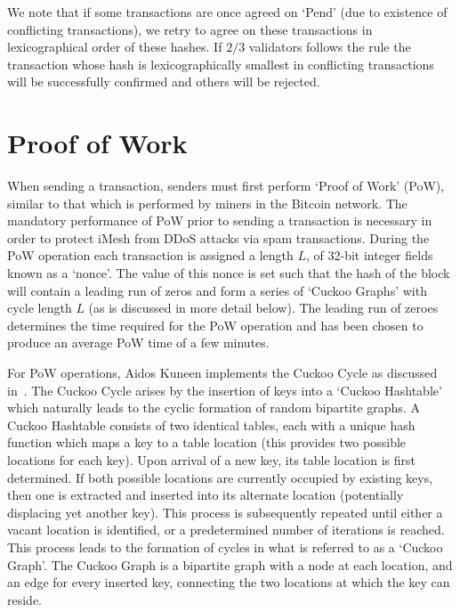 \documentclass[a4paper,10pt,twocolumn]{article}
\begin{document}
We note that if some transactions are once agreed on `Pend' (due to existence of conflicting transactions), we retry to agree on these transactions in lexicographical order of these hashes.
If \(2/3\) validators follows the rule the transaction whose hash is lexicographically smallest in conflicting transactions will be successfully confirmed and others will be rejected.

	\vspace{1.5mm}
	
	
	\section{Proof of Work}
	\label{sec:PoW}
	
	When sending a transaction, senders must first perform `Proof of Work' (PoW), similar to that which is performed by miners in the 
	Bitcoin network. The mandatory performance of PoW prior to sending a transaction is necessary in order to protect iMesh from DDoS 
	attacks via spam transactions. During the PoW operation each transaction is assigned a length \(L\), of 32-bit integer fields known as a `nonce'. 
	The value of this nonce is set such that the hash of the block will contain a leading run of zeros and form a series of `Cuckoo Graphs' with cycle length \(L\) (as is discussed in more detail below). The leading run of zeroes determines the time required for the PoW operation and has been chosen to produce an 
	average PoW time of a few minutes.
	
	\vspace{2.5mm}
	
	For PoW operations, Aidos Kuneen implements the Cuckoo Cycle as discussed in~\cite{cuckoo}. The Cuckoo Cycle arises by the insertion of
	keys into a `Cuckoo Hashtable' which naturally leads to the cyclic formation of random bipartite graphs. A Cuckoo Hashtable consists of 
	two identical tables, each with a unique hash function which maps a key to a table location (this provides two possible locations for 
	each key). Upon arrival of a new key, its table location is first determined. If both possible locations are currently occupied by 
	existing keys, then one is extracted and inserted into its alternate location (potentially displacing yet another key). This process is 
	subsequently repeated until either a vacant location is identified, or a predetermined number of iterations is reached. This process 
	leads to the formation of cycles in what is referred to as a `Cuckoo Graph'. The Cuckoo Graph is a bipartite graph with a node at each 
	location, and an edge for every inserted key, connecting the two locations at which the key can reside.
\end{document}
